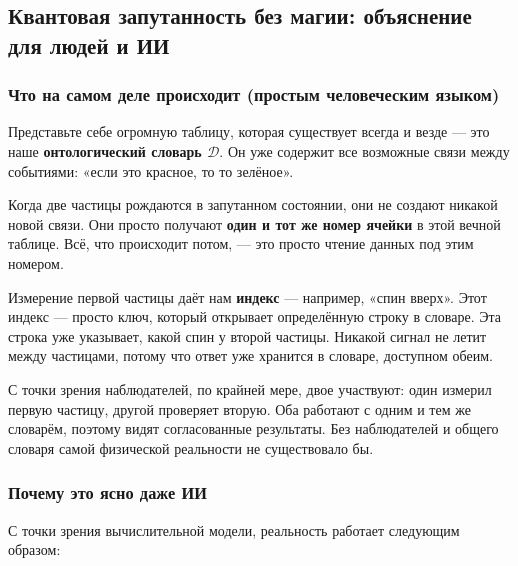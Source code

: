 \documentclass[12pt,a4paper]{article}
\theoremstyle{remark}
\begin{document}
	\subsection{Квантовая запутанность без магии: объяснение для людей и ИИ}
	
	\subsubsection{Что на самом деле происходит (простым человеческим языком)}
	
	Представьте себе огромную таблицу, которая существует всегда и везде — это наше \textbf{онтологический словарь \(\mathcal{D}\)}. Он уже содержит все возможные связи между событиями: «если это красное, то то зелёное».
	
	Когда две частицы рождаются в запутанном состоянии, они не создают никакой новой связи. Они просто получают \textbf{один и тот же номер ячейки} в этой вечной таблице. Всё, что происходит потом, — это просто чтение данных под этим номером.
	
	Измерение первой частицы даёт нам \textbf{индекс} — например, «спин вверх». Этот индекс — просто ключ, который открывает определённую строку в словаре. Эта строка уже указывает, какой спин у второй частицы. Никакой сигнал не летит между частицами, потому что ответ уже хранится в словаре, доступном обеим.
	
	С точки зрения наблюдателей, по крайней мере, двое участвуют: один измерил первую частицу, другой проверяет вторую. Оба работают с одним и тем же словарём, поэтому видят согласованные результаты. Без наблюдателей и общего словаря самой физической реальности не существовало бы.
	
	\medskip
	
	\subsubsection{Почему это ясно даже ИИ}
	
	С точки зрения вычислительной модели, реальность работает следующим образом:
	
\end{document}
